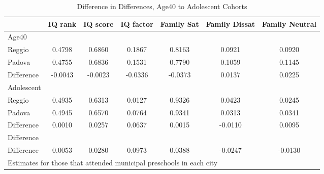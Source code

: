 \begin{table}[htbp]\centering
\caption{Difference in Differences, Age40 to Adolescent Cohorts}
\begin{tabular}{l*{6}{c}}
\hline\hline
            &     IQ rank&    IQ score&   IQ factor&  Family Sat&Family Dissat&Family Neutral\\
\hline
Age40       &            &            &            &            &            &            \\
Reggio      &      0.4798&      0.6860&      0.1867&      0.8163&      0.0921&      0.0920\\
Padova      &      0.4755&      0.6836&      0.1531&      0.7790&      0.1059&      0.1145\\
Difference  &     -0.0043&     -0.0023&     -0.0336&     -0.0373&      0.0137&      0.0225\\
\hline
Adolescent  &            &            &            &            &            &            \\
Reggio      &      0.4935&      0.6313&      0.0127&      0.9326&      0.0423&      0.0245\\
Padova      &      0.4945&      0.6570&      0.0764&      0.9341&      0.0313&      0.0341\\
Difference  &      0.0010&      0.0257&      0.0637&      0.0015&     -0.0110&      0.0095\\
\hline
Difference  &            &            &            &            &            &            \\
Difference  &      0.0053&      0.0280&      0.0973&      0.0388&     -0.0247&     -0.0130\\
\hline\hline
\multicolumn{7}{l}{\footnotesize Estimates for those that attended municipal preschools in each city}\\
\end{tabular}
\end{table}
